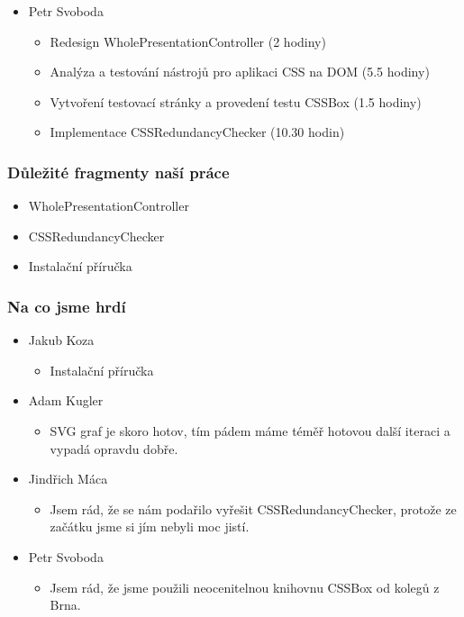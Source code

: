 \documentclass{beamer}
\begin{document}
\begin{frame}[allowframebreaks]
\begin{itemize}
    \item Petr Svoboda
      \begin{itemize}
       \item Redesign WholePresentationController (2 hodiny)
       \item Analýza a testování nástrojů pro aplikaci CSS na DOM (5.5 hodiny)
			 \item Vytvoření testovací stránky a provedení testu CSSBox (1.5 hodiny)
       \item Implementace CSSRedundancyChecker (10.30 hodin)
     \end{itemize}
   \end{itemize}  
\end{frame} 

\begin{frame}[allowframebreaks]\frametitle{Důležité fragmenty naší práce}
  \begin{itemize}
    \item WholePresentationController
		\item CSSRedundancyChecker
		\item Instalační příručka
  \end{itemize}
\end{frame}

\begin{frame}[allowframebreaks]\frametitle{Na co jsme hrdí} 
  \begin{itemize}
    \item Jakub Koza
      \begin{itemize}
       \item Instalační příručka
     \end{itemize}
   
    \item Adam Kugler
      \begin{itemize}
       \item SVG graf je skoro hotov, tím pádem máme téměř hotovou další iteraci a vypadá opravdu dobře.
     \end{itemize}

    \item Jindřich Máca
      \begin{itemize}
       \item Jsem rád, že se nám podařilo vyřešit CSSRedundancyChecker, protože ze začátku jsme si jím nebyli moc jistí.
      \end{itemize}  
   
    \item Petr Svoboda
      \begin{itemize}
       \item Jsem rád, že jsme použili neocenitelnou knihovnu CSSBox od kolegů z Brna.
     \end{itemize}
   \end{itemize}  
\end{frame}
\end{document}
